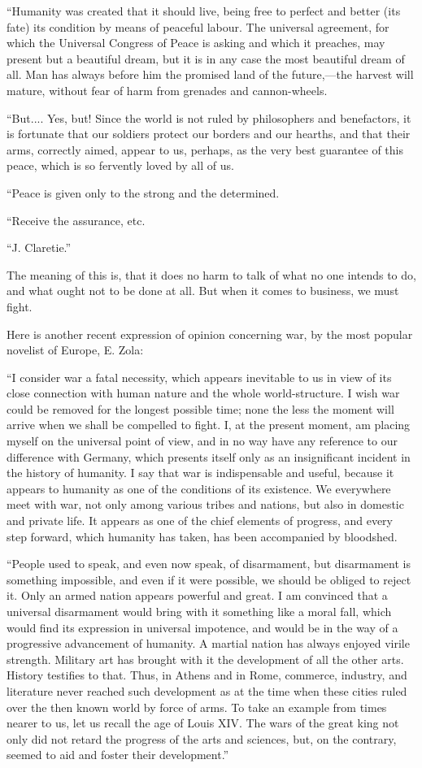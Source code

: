 \documentclass{book}
\begin{document}
“Humanity was created that it should live, being free to perfect and better (its fate) its condition by means of peaceful labour. The universal agreement, for which the Universal Congress of Peace is asking and which it preaches, may present but a beautiful dream, but it is in any case the most beautiful dream of all. Man has always before him the promised land of the future,—the harvest will mature, without fear of harm from grenades and cannon-wheels.

“But.... Yes, but! Since the world is not ruled by philosophers and benefactors, it is fortunate that our soldiers protect our borders and our hearths, and that their arms, correctly aimed, appear to us, perhaps, as the very best guarantee of this peace, which is so fervently loved by all of us.

“Peace is given only to the strong and the determined.

“Receive the assurance, etc.

“J. Claretie.”

The meaning of this is, that it does no harm to talk of what no one intends to do, and what ought not to be done at all. But when it comes to business, we must fight.

Here is another recent expression of opinion concerning war, by the most popular novelist of Europe, E. Zola:

“I consider war a fatal necessity, which appears inevitable to us in view of its close connection with human nature and the whole world-structure. I wish war could be removed for the longest possible time; none the less the moment will arrive when we shall be compelled to fight. I, at the present moment, am placing myself on the universal point of view, and in no way have any reference to our difference with Germany, which presents itself only as an insignificant incident in the history of humanity. I say that war is indispensable and useful, because it appears to humanity as one of the conditions of its existence. We everywhere meet with war, not only among various tribes and nations, but also in domestic and private life. It appears as one of the chief elements of progress, and every step forward, which humanity has taken, has been accompanied by bloodshed.

“People used to speak, and even now speak, of disarmament, but disarmament is something impossible, and even if it were possible, we should be obliged to reject it. Only an armed nation appears powerful and great. I am convinced that a universal disarmament would bring with it something like a moral fall, which would find its expression in universal impotence, and would be in the way of a progressive advancement of humanity. A martial nation has always enjoyed virile strength. Military art has brought with it the development of all the other arts. History testifies to that. Thus, in Athens and in Rome, commerce, industry, and literature never reached such development as at the time when these cities ruled over the then known world by force of arms. To take an example from times nearer to us, let us recall the age of Louis XIV. The wars of the great king not only did not retard the progress of the arts and sciences, but, on the contrary, seemed to aid and foster their development.”
\end{document}
